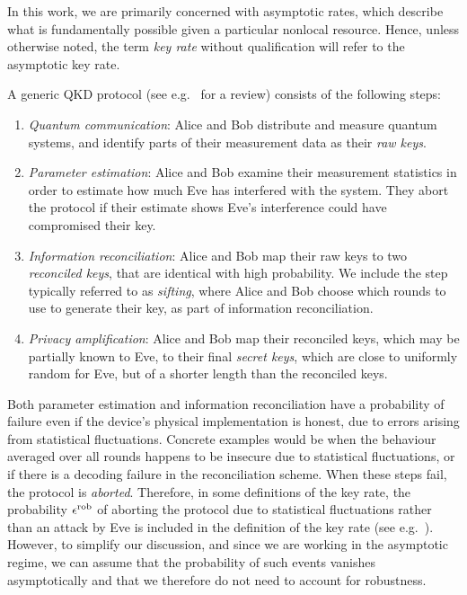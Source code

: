 \documentclass[10pt, a4paper]{article}
\numberwithin{equation}{section} %
\theoremstyle{definition}
\theoremstyle{plain}
\newcommand{\?}{\mathrel{?}} %
\newcommand{\rob}{\rm rob}
\newcommand{\erob}[1][]{\epsilon^{\rob}_{#1}}
\begin{document}
  In this work, we are primarily concerned with asymptotic rates, which describe what is fundamentally possible given a particular nonlocal resource. Hence, unless otherwise noted, the term \emph{key rate} without qualification will refer to the asymptotic key rate.

    A generic QKD protocol (see e.g.~\cite{PracticalQKD} for a review) consists of the following steps:
  \begin{enumerate}
    \item \emph{Quantum communication}: Alice and Bob distribute and measure quantum systems, and identify parts of their measurement data as their \emph{raw keys}.
    \item \emph{Parameter estimation}: Alice and Bob examine their measurement statistics in order to estimate how much Eve has interfered with the system. They abort the protocol if their estimate shows Eve's interference could have compromised their key.
    \item \emph{Information reconciliation}: Alice and Bob map their raw keys to two \emph{reconciled keys}, that are identical with high probability. We include the step typically referred to as \emph{sifting}, where Alice and Bob choose which rounds to use to generate their key, as part of information reconciliation.
    \item \emph{Privacy amplification}: Alice and Bob map their reconciled keys, which may be partially known to Eve, to their final \emph{secret keys}, which are close to uniformly random for Eve, but of a shorter length than the reconciled keys.
\end{enumerate}
    Both parameter estimation and information reconciliation have a probability of failure even if the device's physical implementation is honest, due to errors arising from statistical fluctuations. Concrete examples would be when the behaviour averaged over all rounds happens to be insecure due to statistical fluctuations, or if there is a decoding failure in the reconciliation scheme. When these steps fail, the protocol is \emph{aborted}. Therefore, in some definitions of the key rate, the probability \(\erob\) of aborting the protocol due to statistical fluctuations rather than an attack by Eve is included in the definition of the key rate (see e.g.~\cite{SecurityQKD, CompleteSecurityProof}). However, to simplify our discussion, and since we are working in the asymptotic regime, we can assume that the probability of such events vanishes asymptotically and that we therefore do not need to account for robustness.
\end{document}
